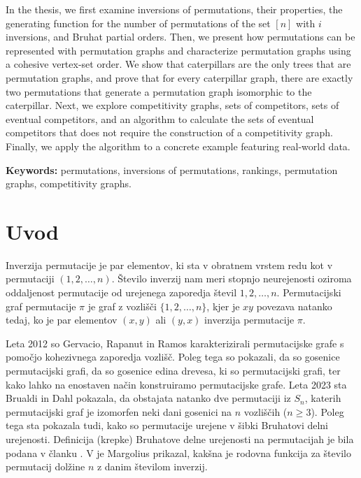 \documentclass[a4paper, 12pt]{book}
\newcommand{\tkeywordsEn}{permutations, inversions of permutations, rankings, permutation graphs, competitivity graphs}
\newcommand{\clearemptydoublepage}{\newpage{\pagestyle{empty}\cleardoublepage}}
\begin{document}
\noindent 
In the thesis, we first examine inversions of permutations, their properties, the generating function for the number of permutations of the set $[n]$ with $i$ inversions, and Bruhat partial orders. Then, we present how permutations can be represented with permutation graphs and characterize permutation graphs using a cohesive vertex-set order. We show that caterpillars are the only trees that are permutation graphs, and prove that for every caterpillar graph, there are exactly two permutations that generate a permutation graph isomorphic to the caterpillar. Next, we explore competitivity graphs, sets of competitors, sets of eventual competitors, and an algorithm to calculate the sets of eventual competitors that does not require the construction of a competitivity graph. Finally, we apply the algorithm to a concrete example featuring real-world data.
\bigskip

\noindent\textbf{Keywords:} \tkeywordsEn.
\clearemptydoublepage

\mainmatter
\setcounter{page}{1}
\pagestyle{fancy}

\chapter {Uvod}

Inverzija permutacije je par elementov, ki sta v obratnem vrstem redu kot v permutaciji $(1, 2,\dots, n)$. Število inverzij nam meri stopnjo neurejenosti oziroma oddaljenost permutacije od urejenega zaporedja števil $1, 2, \dots, n$. Permutacijski graf permutacije $\pi$ je graf z vozlišči $\{ 1, 2, \dots, n \}$, kjer je $xy$ povezava natanko tedaj, ko je par elementov $(x, y)$ ali $(y, x)$ inverzija permutacije $\pi$. 

Leta 2012 so Gervacio, Rapanut in Ramos \cite{charectarizationPermutationGraphs} karakterizirali permutacijske grafe s pomočjo kohezivnega zaporedja vozlišč. Poleg tega so pokazali, da so gosenice permutacijski grafi, da so gosenice edina drevesa, ki so permutacijski grafi, ter kako lahko na enostaven način konstruiramo permutacijske grafe. Leta 2023 sta Brualdi in Dahl \cite{weakBruhatOrder} pokazala, da obstajata natanko dve permutaciji iz $S_n$, katerih permutacijski graf je izomorfen neki dani gosenici na $n$ vozliščih ($n \geq 3$). Poleg tega sta pokazala tudi, kako so permutacije urejene v šibki Bruhatovi delni urejenosti. Definicija (krepke) Bruhatove delne urejenosti na permutacijah je bila podana v članku \cite{bruhatOrder}. V \cite{generatingFunction} je Margolius prikazal, kakšna je rodovna funkcija za število permutacij dolžine $n$ z danim številom inverzij.
\end{document}
